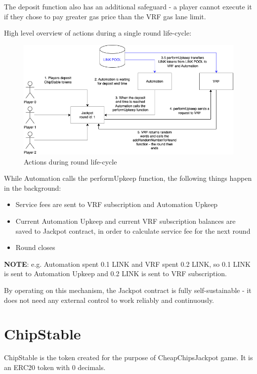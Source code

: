 \documentclass[12pt]{article}
\begin{document}
The deposit function also has an additional safeguard - a player cannot execute it if they chose to pay greater gas price than the VRF gas lane limit.

\newpage
High level overview of actions during a single round life-cycle:
\begin{figure}[!ht]
    \centering
    \includegraphics[scale=0.6]{images/fees.png} 
    \caption{Actions during round life-cycle}
    \label{fig:b1}
\end{figure}
\FloatBarrier


While Automation calls the performUpkeep function, the following things happen in the background:
\begin{itemize}
    \item Service fees are sent to VRF subscription and Automation Upkeep
    \item Current Automation Upkeep and current VRF subscription balances are saved to Jackpot contract, in order to calculate service fee for the next round
    \item Round closes
\end{itemize}

\textbf{NOTE}: e.g. Automation spent 0.1 LINK and VRF spent 0.2 LINK, so 0.1 LINK is sent to Automation Upkeep and 0.2 LINK is sent to VRF subscription.

\hfill

By operating on this mechanism, the Jackpot contract is fully self-sustainable - it does not need any external control to work reliably and continuously. 

\section{ChipStable}
ChipStable is the token created for the purpose of CheapChipsJackpot game. It is an ERC20\cite{erc20} token with 0 decimals.

\newpage
\printbibliography
\end{document}
